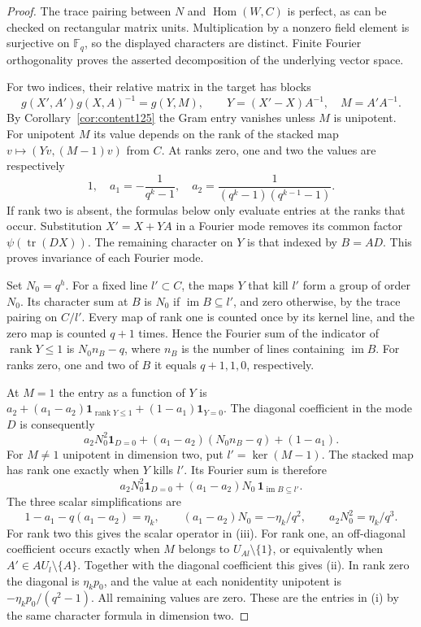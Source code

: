\documentclass[a4paper,11pt]{article}
\theoremstyle{definition}
\theoremstyle{remark}
\numberwithin{equation}{section}
\begin{document}
\begin{proof}
The trace pairing between \(N\) and \(\operatorname{Hom}(W,C)\)
is perfect, as can be checked on rectangular matrix units.
Multiplication by a nonzero field element is surjective on
\(\mathbb F_q\), so the displayed characters are distinct.
Finite Fourier orthogonality proves the asserted decomposition
of the underlying vector space.

For two indices, their relative matrix in the target has blocks
\[
       g(X',A')g(X,A)^{-1}=g(Y,M),\qquad
                  Y=(X'-X)A^{-1},\quad M=A'A^{-1}.
\]
By Corollary~\ref{cor:content125} the Gram entry vanishes unless
\(M\) is unipotent. For unipotent \(M\) its value depends on
the rank of the stacked map \(v\mapsto(Yv,(M-1)v)\) from \(C\).
At ranks zero, one and two the values are respectively
\[
       1,\quad a_1=-\frac1{q^k-1},\quad
              a_2=\frac1{(q^k-1)(q^{k-1}-1)} .
\]
If rank two is absent, the formulas below only evaluate entries
at the ranks that occur. Substitution \(X'=X+YA\) in a Fourier
mode removes its common factor \(\psi(\operatorname{tr}(DX))\).
The remaining character on \(Y\) is that indexed by \(B=AD\).
This proves invariance of each Fourier mode.

Set \(N_0=q^h\). For a fixed line \(l'\subset C\), the maps
\(Y\) that kill \(l'\) form a group of order \(N_0\).
Its character sum at \(B\) is \(N_0\) if
\(\operatorname{im}B\subseteq l'\), and zero otherwise, by
the trace pairing on \(C/l'\). Every map of rank one is
counted once by its kernel line, and the zero map is counted
\(q+1\) times. Hence the Fourier sum of the indicator of
\(\operatorname{rank}Y\le1\) is \(N_0 n_B-q\), where \(n_B\)
is the number of lines containing \(\operatorname{im} B\).
For ranks zero, one and two of \(B\) it equals \(q+1,1,0\),
respectively.

At \(M=1\) the entry as a function of \(Y\) is
\(a_2+(a_1-a_2)\mathbf1_{\operatorname{rank}Y\le1}
+(1-a_1)\mathbf1_{Y=0}\). The diagonal coefficient in the
mode \(D\) is consequently
\[
 a_2 N_0^2\mathbf1_{D=0}
       +(a_1-a_2)(N_0 n_B-q)+(1-a_1).
\]
For \(M\ne1\) unipotent in dimension two, put
\(l'=\ker(M-1)\). The stacked map has rank one exactly when
\(Y\) kills \(l'\). Its Fourier sum is therefore
\[
    a_2 N_0^2\mathbf1_{D=0}
          +(a_1-a_2)N_0\,\mathbf1_{\operatorname{im}B\subseteq l'} .
\]
The three scalar simplifications are
\[
  1-a_1-q(a_1-a_2)=\eta_k,\qquad
  (a_1-a_2)N_0=-\eta_k/q^2,\qquad
  a_2N_0^2=\eta_k/q^3 .
\]
For rank two this gives the scalar operator in (iii).
For rank one, an off-diagonal coefficient occurs exactly
when \(M\) belongs to \(U_{Al}\setminus\{1\}\), or equivalently
when \(A'\in A U_l\setminus\{A\}\). Together with the diagonal
coefficient this gives (ii). In rank zero the diagonal is
\(\eta_k p_0\), and the value at each nonidentity unipotent is
\(-\eta_k p_0/(q^2-1)\). All remaining values are zero.
These are the entries in (i) by the same character formula
in dimension two.
\end{proof}
\end{document}
